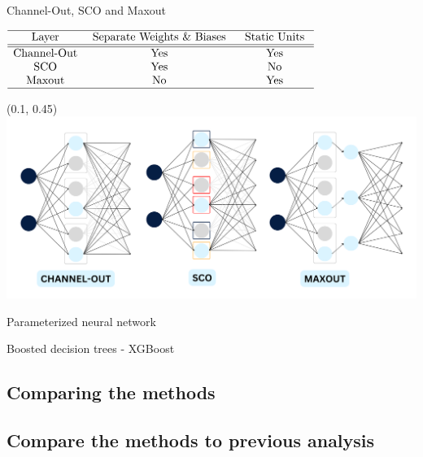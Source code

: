 \documentclass[UKenglish]{beamer}
\begin{document}
\begin{frame}{Channel-Out, SCO and Maxout}
    \center
        \begin{table}
            $
            \begin{array}{cccc}
                \hline \text { Layer } & \text { Separate Weights $\&$ Biases } & \text { Static Units }\\
                \hline\hline\text{Channel-Out} & \text{Yes} &  \text{Yes}  \\
                \text { SCO } &  \text{Yes} &  \text{No}  \\
                \text{ Maxout } &  \text{No} &  \text{Yes}   \\
                \hline
            \end{array}
            $
        \end{table}
    \begin{textblock}{0.8}(0.1, 0.45)
        \includegraphics[width = \textwidth]{figures/EnsembleComp}
    \end{textblock}
\end{frame}


\begin{frame}{Parameterized neural network}
    
\end{frame}


\begin{frame}{Boosted decision trees - XGBoost}
 
\end{frame}
\subsection{Comparing the methods}

\subsection{Compare the methods to previous analysis}
\end{document}
